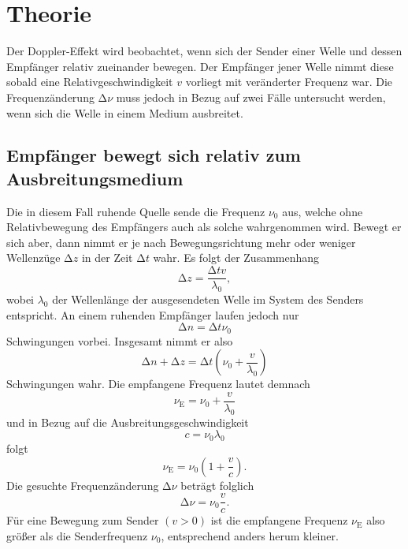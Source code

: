 \section{Theorie}
\label{sec:Theorie}
Der Doppler-Effekt wird beobachtet, wenn sich der Sender einer Welle und dessen Empfänger relativ zueinander bewegen.
Der Empfänger jener Welle nimmt diese sobald eine Relativgeschwindigkeit $v$ vorliegt mit veränderter Frequenz war.
Die Frequenzänderung $\increment \nu$ muss jedoch in Bezug auf zwei Fälle untersucht werden, wenn sich die Welle in einem Medium ausbreitet.\\
\subsection{Empfänger bewegt sich relativ zum Ausbreitungsmedium}
Die in diesem Fall ruhende Quelle sende die Frequenz $\nu_0$ aus, welche ohne Relativbewegung des Empfängers auch als solche wahrgenommen wird.
Bewegt er sich aber, dann nimmt er je nach Bewegungsrichtung mehr oder weniger Wellenzüge $\increment z$ in der Zeit $\increment t$ wahr.
Es folgt der Zusammenhang
\begin{equation}
  \increment z = \frac{\increment t v}{\lambda_0} \label{eqn:1},
\end{equation}
wobei $\lambda_0$ der Wellenlänge der ausgesendeten Welle im System des Senders entspricht.
An einem ruhenden Empfänger laufen jedoch nur
\begin{equation}
  \increment n = \increment t \nu_0 \label{eqn:2}
\end{equation}
Schwingungen vorbei.
Insgesamt nimmt er also
\begin{equation}
  \increment n + \increment z = \increment t \left( \nu_0 + \frac{v}{\lambda_0}\right) \label{eqn:3}
\end{equation}
Schwingungen wahr.
Die empfangene Frequenz lautet demnach
\begin{equation}
  \nu_{\text{E}} = \nu_0 + \frac{v}{\lambda_0} \label{eqn:4}
\end{equation}
und in Bezug auf die Ausbreitungsgeschwindigkeit
\begin{equation}
  \label{eqn:4.5}
  c = \nu_0 \lambda_0
\end{equation}
folgt
\begin{equation}
  \nu_{\text{E}} = \nu_0 \left(1 + \frac{v}{c} \right). \label{eqn:5}
\end{equation}
Die gesuchte Frequenzänderung $\increment \nu$ beträgt folglich
\begin{equation}
  \increment \nu = \nu_0 \frac{v}{c}. \label{eqn:5}
\end{equation}
Für eine Bewegung zum Sender $(v>0)$ ist die empfangene Frequenz $\nu_{\text{E}}$ also größer als die Senderfrequenz $\nu_0$, entsprechend anders herum kleiner.
